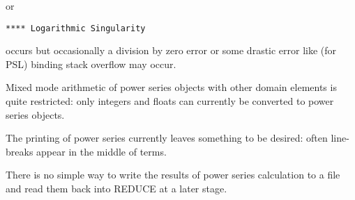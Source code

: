 or

\hspace*{2em} {\tt ***** Logarithmic Singularity}

occurs but occasionally a division by
zero error or some drastic error like (for PSL) binding stack
overflow may occur.

Mixed mode arithmetic of power series objects with other domain
elements is quite restricted: only integers and floats can currently
be converted to power series objects.

The printing of power series currently leaves something to be
desired: often line-breaks appear in the middle of terms.

There is no simple way to write the results of power series
calculation to a file and read them back into REDUCE at a later
stage.



